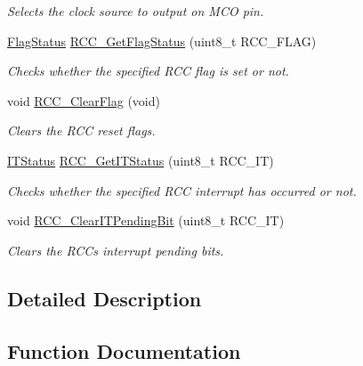 \begin{DoxyCompactItemize}
\begin{DoxyCompactList}\small\item\em Selects the clock source to output on M\+CO pin. \end{DoxyCompactList}\item 
\hyperlink{group___exported__types_ga89136caac2e14c55151f527ac02daaff}{Flag\+Status} \hyperlink{group___r_c_c___exported___functions_ga2897bdc52f272031c44fb1f72205d295}{R\+C\+C\+\_\+\+Get\+Flag\+Status} (uint8\+\_\+t R\+C\+C\+\_\+\+F\+L\+AG)
\begin{DoxyCompactList}\small\item\em Checks whether the specified R\+CC flag is set or not. \end{DoxyCompactList}\item 
void \hyperlink{group___r_c_c___exported___functions_ga53f909dbb15a54124419084ebda97d72}{R\+C\+C\+\_\+\+Clear\+Flag} (void)
\begin{DoxyCompactList}\small\item\em Clears the R\+CC reset flags. \end{DoxyCompactList}\item 
\hyperlink{group___exported__types_gaacbd7ed539db0aacd973a0f6eca34074}{I\+T\+Status} \hyperlink{group___r_c_c___exported___functions_ga6126c99f398ee4be410ad76ae3aee18f}{R\+C\+C\+\_\+\+Get\+I\+T\+Status} (uint8\+\_\+t R\+C\+C\+\_\+\+IT)
\begin{DoxyCompactList}\small\item\em Checks whether the specified R\+CC interrupt has occurred or not. \end{DoxyCompactList}\item 
void \hyperlink{group___r_c_c___exported___functions_ga529842d165910f8f87e26115da36089b}{R\+C\+C\+\_\+\+Clear\+I\+T\+Pending\+Bit} (uint8\+\_\+t R\+C\+C\+\_\+\+IT)
\begin{DoxyCompactList}\small\item\em Clears the R\+CC\textquotesingle{}s interrupt pending bits. \end{DoxyCompactList}\end{DoxyCompactItemize}


\subsection{Detailed Description}


\subsection{Function Documentation}
\mbox{\label{group___r_c_c___exported___functions_gadda89cdb838bf49e5fa10f3f774530a4}} 
